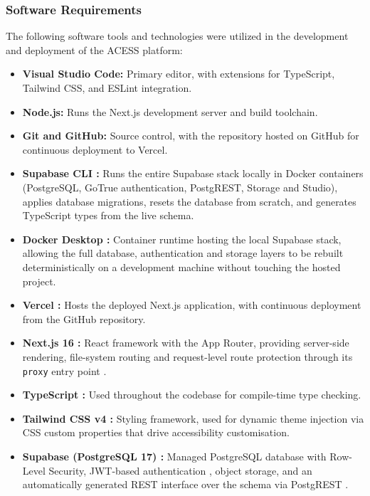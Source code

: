 \documentclass[12pt, oneside]{article} %
\begin{document}
\subsubsection{Software Requirements}

The following software tools and technologies were utilized in the development and deployment of the ACESS platform:

\begin{itemize}
    \item \textbf{Visual Studio Code:} Primary editor, with extensions for TypeScript, Tailwind CSS, and ESLint integration.
    \item \textbf{Node.js:} Runs the Next.js development server and build toolchain.
    \item \textbf{Git and GitHub:} Source control, with the repository hosted on GitHub for continuous deployment to Vercel.
    \item \textbf{Supabase CLI \cite{supabase_cli}:} Runs the entire Supabase stack locally in Docker containers (PostgreSQL, GoTrue authentication, PostgREST, Storage and Studio), applies database migrations, resets the database from scratch, and generates TypeScript types from the live schema.
    \item \textbf{Docker Desktop \cite{docker_docs}:} Container runtime hosting the local Supabase stack, allowing the full database, authentication and storage layers to be rebuilt deterministically on a development machine without touching the hosted project.
    \item \textbf{Vercel \cite{vercel_docs}:} Hosts the deployed Next.js application, with continuous deployment from the GitHub repository.
    \item \textbf{Next.js 16 \cite{nextjs_ssr}:} React framework with the App Router, providing server-side rendering, file-system routing and request-level route protection through its \texttt{proxy} entry point \cite{nextjs_middleware}.
    \item \textbf{TypeScript \cite{typescript_docs}:} Used throughout the codebase for compile-time type checking.
    \item \textbf{Tailwind CSS v4 \cite{tailwind_docs}:} Styling framework, used for dynamic theme injection via CSS custom properties that drive accessibility customisation.
    \item \textbf{Supabase (PostgreSQL 17) \cite{supabase_docs,postgresql_docs}:} Managed PostgreSQL database with Row-Level Security, JWT-based authentication \cite{supabase_auth}, object storage, and an automatically generated REST interface over the schema via PostgREST \cite{postgrest_docs}.

\end{itemize}
\end{document}

